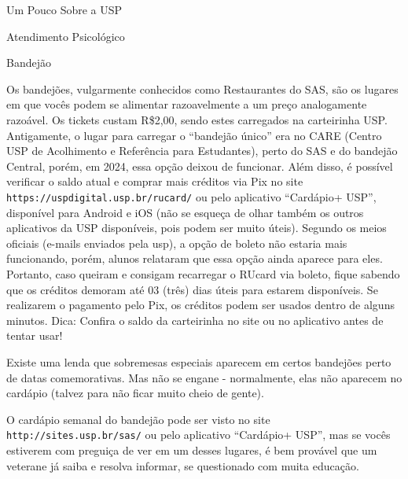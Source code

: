 \begin{secao}{Um Pouco Sobre a USP}
\begin{subsecao}{Atendimento Psicológico}
\end{subsecao}


\begin{subsecao}{Bandejão}


Os bandejões, vulgarmente conhecidos como Restaurantes do SAS, são os lugares
em que vocês podem se alimentar razoavelmente a um preço analogamente razoável.
Os tickets custam R\$2,00, sendo estes carregados na carteirinha USP. Antigamente, o
lugar para carregar o ``bandejão único'' era no CARE (Centro USP de Acolhimento e 
Referência para Estudantes), perto do SAS e do bandejão Central, porém, em 2024, essa
opção deixou de funcionar. Além disso, é possível verificar o saldo atual e comprar 
mais créditos via Pix no site {\tt https://uspdigital.usp.br/rucard/} ou pelo
aplicativo ``Cardápio+ USP'', disponível para Android e iOS (não se esqueça de olhar 
também os outros aplicativos da USP disponíveis, pois podem ser muito úteis).
Segundo os meios oficiais (e-mails enviados pela usp), a opção de boleto não 
estaria mais funcionando, porém, alunos relataram que essa opção ainda aparece 
para eles. Portanto, caso queiram e consigam recarregar o RUcard via boleto, fique 
sabendo que os créditos demoram até 03 (três) dias úteis para estarem disponíveis.
Se realizarem o pagamento pelo Pix, os créditos podem ser usados dentro de alguns
minutos.
Dica: Confira o saldo da carteirinha no site ou no aplicativo antes de tentar usar!

Existe uma lenda que sobremesas especiais aparecem em certos bandejões perto de
datas comemorativas. Mas não se engane - normalmente, elas não aparecem no
cardápio (talvez para não ficar muito cheio de gente).


O cardápio semanal do bandejão pode ser visto no site {\tt
http://sites.usp.br/sas/} ou pelo aplicativo ``Cardápio+ USP'', mas se vocês
estiverem com preguiça de ver em um desses lugares, é bem provável que um veterane 
já saiba e resolva informar, se questionado com muita educação.


\end{subsecao}
\end{secao}
